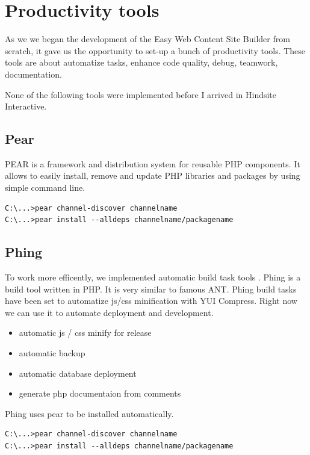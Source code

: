 \chapter{Productivity tools}
As we we began the development of the Easy Web Content Site Builder from scratch, it gave us the opportunity to set-up a bunch of productivity tools. These tools are about automatize tasks, enhance code quality, debug, teamwork, documentation.

None of the following tools were implemented before I arrived in Hindsite Interactive. 
\section{Pear}

PEAR is a framework and distribution system for reusable PHP components. It allows to easily install, remove and update PHP libraries and packages by using simple command line.

\lstset{language=bash}
\begin{lstlisting}[label=pear-install,caption=Installation of pear packages]
C:\...>pear channel-discover channelname
C:\...>pear install --alldeps channelname/packagename
\end{lstlisting}

\section{Phing}

To work more efficently, we implemented automatic build task tools . Phing is a build tool written in PHP. It is very similar to famous ANT. Phing build tasks have been set to automatize js/css minification with YUI Compress.
Right now we can use it to automate deployment and development.
\begin{itemize}
\item automatic js / css minify for release
\item automatic backup
\item automatic database deployment
\item generate php documentaion from comments
\end{itemize}

Phing uses pear to be installed automatically.

\lstset{language=bash}
\begin{lstlisting}[label=phing-install,caption=Installation of Phing]
C:\...>pear channel-discover channelname
C:\...>pear install --alldeps channelname/packagename
\end{lstlisting}

